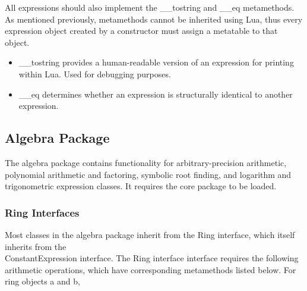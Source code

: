 \documentclass{article}
\begin{document}
All expressions should also implement the {\ttfamily \_\_tostring} and {\ttfamily \_\_eq} metamethods. As mentioned previously, metamethods cannot be inherited using Lua, thus every expression object created by a constructor must assign a metatable to that object.

\begin{itemize}
    \item {\ttfamily \_\_tostring} provides a human-readable version of an expression for printing within Lua. Used for debugging purposes.
    
    \item {\ttfamily \_\_eq} determines whether an expression is structurally identical to another expression.
\end{itemize}

\subsection{Algebra Package}

The algebra package contains functionality for arbitrary-precision arithmetic, polynomial arithmetic and factoring, symbolic root finding, and logarithm and trigonometric expression classes. It requires the core package to be loaded.

\subsubsection{Ring Interfaces}

Most classes in the algebra package inherit from the {\ttfamily Ring} interface, which itself inherits from the \\ {\ttfamily ConstantExpression} interface. The {\ttfamily Ring} interface interface requires the following arithmetic operations, which have corresponding metamethods listed below. For ring objects {\ttfamily a} and {\ttfamily b},
\end{document}
